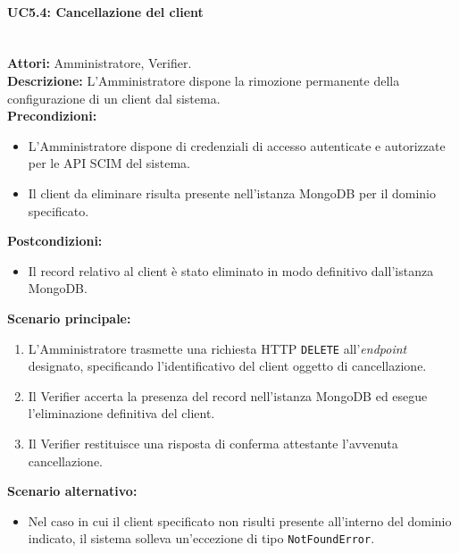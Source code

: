 \paragraph{\large\bfseries UC5.4: Cancellazione del client}
\label{uc:verifier:uc5.4}
\mbox{}\\
\noindent\textbf{Attori:} Amministratore, Verifier.
\\
\noindent\textbf{Descrizione:} L'Amministratore dispone la rimozione permanente della configurazione di un client dal sistema.
\\
\noindent\textbf{Precondizioni:}
\begin{itemize}
    \item L'Amministratore dispone di credenziali di accesso autenticate e autorizzate per le API SCIM del sistema.
    \item Il client da eliminare risulta presente nell'istanza MongoDB per il dominio specificato.
\end{itemize}
\noindent\textbf{Postcondizioni:}
\begin{itemize}
    \item Il record relativo al client è stato eliminato in modo definitivo dall'istanza MongoDB.
\end{itemize}

\noindent\textbf{Scenario principale:}
\begin{enumerate}
    \item L'Amministratore trasmette una richiesta HTTP \texttt{DELETE} all'\textit{endpoint} designato, specificando l'identificativo del client oggetto di cancellazione.
    \item Il Verifier accerta la presenza del record nell'istanza MongoDB ed esegue l'eliminazione definitiva del client.
    \item Il Verifier restituisce una risposta di conferma attestante l'avvenuta cancellazione.
\end{enumerate}

\noindent\textbf{Scenario alternativo:}
\begin{itemize}
    \item Nel caso in cui il client specificato non risulti presente all'interno del dominio indicato, il sistema solleva un'eccezione di tipo \texttt{NotFoundError}.
\end{itemize}

